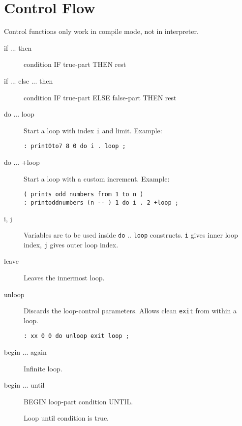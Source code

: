 \section{Control Flow}

Control functions only work in compile mode, not in interpreter.

\begin{description}
\item[if ... then]

condition IF true-part THEN rest

\item[if ... else ... then]

condition IF true-part ELSE false-part THEN rest

\item[do ... loop] Start a loop with index \texttt{i} and limit. Example:

\begin{verbatim}
: print0to7 8 0 do i . loop ;
\end{verbatim}

\item[do ... +loop] Start a loop with a custom increment. Example:

\begin{verbatim}
( prints odd numbers from 1 to n )
: printoddnumbers (n -- ) 1 do i . 2 +loop ;
\end{verbatim}

\item[i, j] Variables are to be used inside \texttt{do} .. \texttt{loop} constructs.
\texttt{i} gives inner loop index, \texttt{j} gives outer loop index.

\item[leave] Leaves the innermost loop.

\item[unloop] Discards the loop-control parameters. Allows clean \texttt{exit} from within a loop.

\begin{verbatim}
: xx 0 0 do unloop exit loop ;
\end{verbatim}

\item[begin ... again]

Infinite loop.

\item[begin ... until]

BEGIN loop-part condition UNTIL.

Loop until condition is true.


\end{description}
